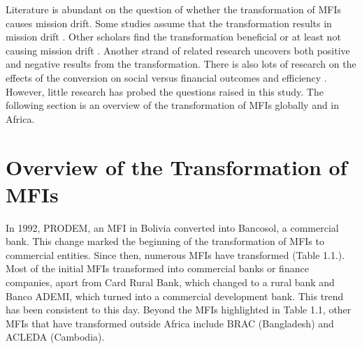 \documentclass[a4paper, nobind]{templates/ociamthesis}
\begin{document}
Literature is abundant on the question of whether the transformation of MFIs causes mission drift. Some studies assume that the transformation results in mission drift \autocite{mia2017mission,wagenaar2012institutional,lopatta2017sustainable,roberts2013endogeneity}. Other scholars find the transformation beneficial or at least not causing mission drift \autocite{im2015profits,lutzenkirchen2012microfinance,quayes2012depth,mersland2010microfinance}. Another strand of related research uncovers both positive and negative results from the transformation\autocite{kar2012does,caudill2009microfinance}. There is also lots of research on the effects of the conversion on social versus financial outcomes and efficiency \autocite{bogan2012capital,kar2012does,tchuigoua2014institutional,khachatryan2017performance}. However, little research has probed the questions raised in this study. The following section is an overview of the transformation of MFIs globally and in Africa.

\hypertarget{overview-of-the-transformation-of-mfis}{%
\section{Overview of the Transformation of MFIs}\label{overview-of-the-transformation-of-mfis}}

\noindent In 1992, PRODEM, an MFI in Bolivia converted into Bancosol, a commercial bank. This change marked the beginning of the transformation of MFIs to commercial entities. Since then, numerous MFIs have transformed (Table 1.1.). Most of the initial MFIs transformed into commercial banks or finance companies, apart from Card Rural Bank, which changed to a rural bank and Banco ADEMI, which turned into a commercial development bank. This trend has been consistent to this day. Beyond the MFIs highlighted in Table 1.1, other MFIs that have transformed outside Africa include BRAC (Bangladesh) and ACLEDA (Cambodia).
\end{document}
